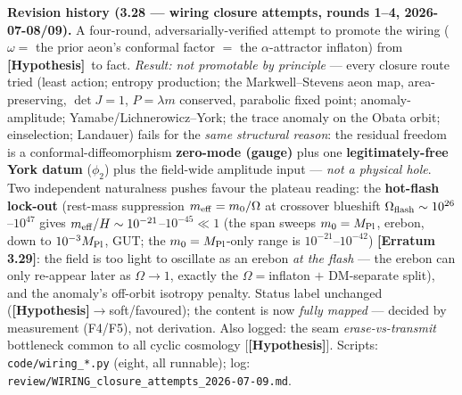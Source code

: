 \documentclass[11pt]{article}
\newcommand{\hyp}{\textcolor{orange!80!black}{\textbf{[Hypothesis]}}}
\begin{document}
{\smallskip\noindent\textbf{Revision history (3.28 --- wiring closure attempts, rounds 1--4, 2026-07-08/09).} A four-round, adversarially-verified attempt to promote the wiring ($\omega=$ the prior aeon's conformal factor $=$ the $\alpha$-attractor inflaton) from \hyp\ to fact. \emph{Result: not promotable by principle} --- every closure route tried (least action; entropy production; the Markwell--Stevens aeon map, area-preserving, $\det J=1$, $P=\lambda m$ conserved, parabolic fixed point; anomaly-amplitude; Yamabe/Lichnerowicz--York; the trace anomaly on the Obata orbit; einselection; Landauer) fails for the \emph{same structural reason}: the residual freedom is a conformal-diffeomorphism \textbf{zero-mode (gauge)} plus one \textbf{legitimately-free York datum} ($\phi_2$) plus the field-wide amplitude input --- \emph{not a physical hole}. Two independent naturalness pushes favour the plateau reading: the \textbf{hot-flash lock-out} (rest-mass suppression $m_{\rm eff}=m_0/\Omega$ at crossover blueshift $\Omega_{\rm flash}\sim10^{26}$--$10^{47}$ gives $m_{\rm eff}/H\sim10^{-21}$--$10^{-45}\ll1$ (the span sweeps $m_0=M_{\rm Pl}$, erebon, down to $10^{-3}M_{\rm Pl}$, GUT; the $m_0=M_{\rm Pl}$-only range is $10^{-21}$--$10^{-42}$) \textbf{[Erratum 3.29]}: the field is too light to oscillate as an erebon \emph{at the flash} --- the erebon can only re-appear later as $\Omega\to1$, exactly the $\Omega=$inflaton $+$ DM-separate split), and the anomaly's off-orbit isotropy penalty. Status label unchanged (\hyp$\to$soft/favoured); the content is now \emph{fully mapped} --- decided by measurement (F4/F5), not derivation. Also logged: the seam \emph{erase-vs-transmit} bottleneck common to all cyclic cosmology [\hyp]. Scripts: \texttt{code/wiring\_*.py} (eight, all runnable); log: \texttt{review/WIRING\_closure\_attempts\_2026-07-09.md}.

}
\end{document}
